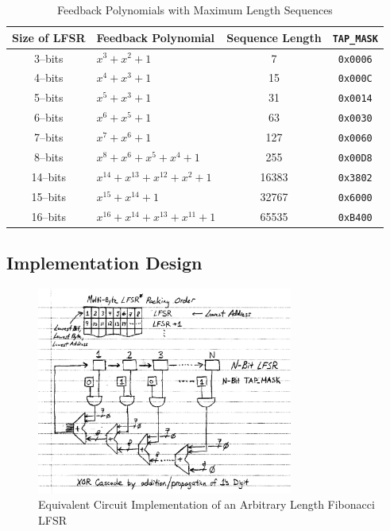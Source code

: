 \documentclass[11pt]{article}
\begin{document}
\begin{table}
\centering
\caption{Feedback Polynomials with Maximum Length Sequences}
\begin{tabular}{c | l | c | c}
\hline\hline
Size of LFSR	&Feedback Polynomial	&Sequence Length	&\texttt{TAP\_MASK}	\\
\hline
3--bits	&$x^{3}+x^{2}+1$		&7	&\texttt{0x0006}	\\
4--bits	&$x^{4}+x^{3}+1$		&15	&\texttt{0x000C}	\\
5--bits	&$x^{5}+x^{3}+1$		&31	&\texttt{0x0014}	\\
6--bits	&$x^{6}+x^{5}+1$		&63	&\texttt{0x0030}	\\
7--bits	&$x^{7}+x^{6}+1$		&127	&\texttt{0x0060}	\\
8--bits	&$x^{8}+x^{6}+x^{5}+x^{4}+1$	&255	&\texttt{0x00D8}	\\
14--bits&$x^{14}+x^{13}+x^{12}+x^{2}+1$	&16383	&\texttt{0x3802}	\\
15--bits&$x^{15}+x^{14}+1$		&32767	&\texttt{0x6000}	\\
16--bits&$x^{16}+x^{14}+x^{13}+x^{11}+1$&65535	&\texttt{0xB400}	\\
\hline\hline
\end{tabular}
\label{feedback-polynomials-table}
\end{table}

\subsection{Implementation Design}

\begin{figure}
	\centering
	\includegraphics[width=0.75\textwidth]{Figures/fibonacci-equivalent-circuit.pdf}
	\caption{Equivalent Circuit Implementation of an Arbitrary Length Fibonacci LFSR}
	\label{fibonacci-equivalent-circuit}
\end{figure}
\end{document}
